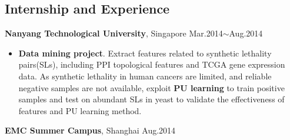 \documentclass[margin]{res}
\begin{document}
\begin{resume}
\section{Internship and Experience}
\textbf{Nanyang Technological University}, Singapore \hfill Mar.2014$\sim$Aug.2014
\begin{itemize}
\item \textbf{Data mining project}. Extract features related to synthetic lethality pairs(SLs), including PPI topological features and TCGA gene expression data. As synthetic lethality in human cancers are limited, and reliable negative samples are not available, exploit \textbf{PU learning} to train positive samples and test on abundant SLs in yeast to validate the effectiveness of features and PU learning method.
\end{itemize}
\begin{spacing}{1.5}
\end{spacing}
\textbf{EMC Summer Campus}, Shanghai \hfill Aug.2014

\end{resume}
\end{document}
